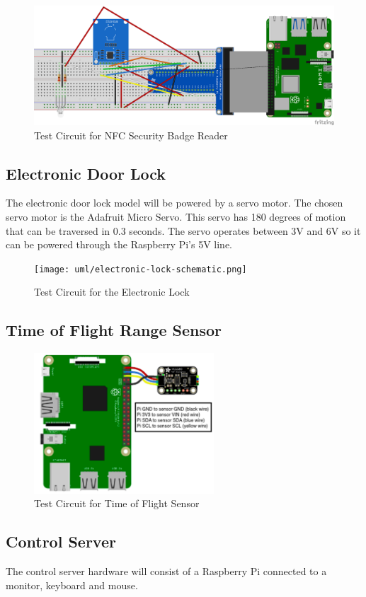 \begin{figure}[!htb]
\centering
\includegraphics[width=\textwidth]{images/nfc-test-circuit.png}
\caption{Test Circuit for NFC Security Badge Reader}
\label{fig:nfc-test-circuit}
\end{figure}

\subsection{Electronic Door Lock}

The electronic door lock model will be powered by a servo motor. The chosen
servo motor is the Adafruit Micro Servo.  This servo has 180 degrees of motion
that can be traversed in 0.3 seconds.  The servo operates between 3V and 6V so
it can be powered through the Raspberry Pi's 5V line.

\begin{figure}[!htb]
\centering
\texttt{[image: uml/electronic-lock-schematic.png]}
\caption{Test Circuit for the Electronic Lock}
\label{fig:electronic-lock-schematic}
\end{figure}

\subsection{Time of Flight Range Sensor}

\begin{figure}[!htb]
\centering
\includegraphics[width=0.6\textwidth]{images/tof-test-circuit.png}
\caption{Test Circuit for Time of Flight Sensor}
\label{fig:tof-test-circuit}
\end{figure}


\subsection{Control Server}

The control server hardware will consist of a Raspberry Pi connected to a
monitor, keyboard and mouse.

